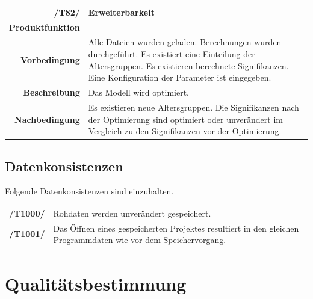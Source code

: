 \documentclass{article}
\begin{document}
\begin{table}[H]
\begin{tabularx}{\textwidth}{rX} \vspace{1mm}
\textbf{/T82/}         & \textbf{Erweiterbarkeit} \\ \vspace{1mm}
\textbf{Produktfunktion} & \nameref{sec:f:Modell optimieren} \\
\textbf{Vorbedingung}  & Alle Dateien wurden geladen. Berechnungen wurden durchgeführt. Es existiert eine Einteilung der Altersgruppen. Es existieren berechnete Signifikanzen. Eine Konfiguration der Parameter ist eingegeben.\\
\vspace{1mm}
\textbf{Beschreibung}  & Das Modell wird optimiert. \\
\textbf{Nachbedingung} & Es existieren neue Altersgruppen. Die Signifikanzen nach der Optimierung sind optimiert oder unverändert im Vergleich zu den Signifikanzen vor der Optimierung.
\end{tabularx}
\end{table}

\subsection{Datenkonsistenzen}
Folgende Datenkonsistenzen sind einzuhalten.
\begin{table}[H]
\begin{tabularx}{\textwidth}{rX}
\textbf{/T1000/}        & Rohdaten werden unverändert gespeichert. \\     \textbf{/T1001/}        & Das Öffnen eines gespeicherten Projektes resultiert in den gleichen Programmdaten wie vor dem Speichervorgang. \\
\end{tabularx}
\end{table}

\clearpage
\section{Qualitätsbestimmung}
\end{document}
